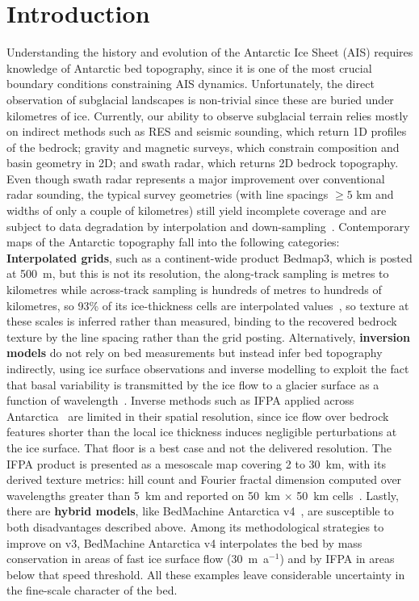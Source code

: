 \chapter{Introduction}\label{intro}

Understanding the history and evolution of the Antarctic Ice Sheet (AIS) requires knowledge of Antarctic bed topography, since it is one of the most crucial boundary 
conditions constraining AIS dynamics. Unfortunately, the direct observation of subglacial landscapes is non-trivial since these are buried under kilometres of ice.
Currently, our ability to observe subglacial terrain relies mostly on indirect methods such as RES and seismic sounding, which return 1D profiles of the bedrock; gravity and magnetic surveys, which constrain composition and basin geometry in 2D; and swath radar, which returns 2D bedrock topography. Even though swath radar represents a major improvement over conventional radar sounding, the typical survey geometries (with line spacings $\geq5$ km and widths of only a couple of kilometres) still yield incomplete coverage and are subject to data degradation by interpolation and down-sampling~\cite{Holschuh_2020}.
Contemporary maps of the Antarctic topography fall into the following categories:\\
\textbf{Interpolated grids}, such as a continent-wide product Bedmap3, which is posted at 500~m, but this is not its resolution, the along-track sampling is metres to kilometres while across-track sampling is hundreds of metres to hundreds of kilometres, so 93\% of its ice-thickness cells are interpolated values~\cite{Pritchard_2025}, so texture at these scales is inferred rather than measured, binding to the recovered bedrock texture by the line spacing
rather than the grid posting. Alternatively, \textbf{inversion models} do not rely on bed measurements but instead infer bed topography indirectly, using ice surface observations and inverse modelling to exploit the fact that basal variability is transmitted by the ice flow to a glacier surface as a function of wavelength~\cite{Gudmundsson_2003}. Inverse methods such as IFPA applied across Antarctica~\cite{Ockenden_2026} are limited in their spatial resolution, since ice flow over bedrock features shorter than the local ice thickness induces negligible perturbations at the ice surface. That floor is a best case and not the delivered resolution. The IFPA product is presented as a mesoscale map covering 2 to 30~km, with its derived texture metrics: hill count and Fourier fractal dimension computed over wavelengths greater than 5~km and reported on 50~km $\times$ 50~km cells~\cite{Ockenden_2026}. Lastly, there are \textbf{hybrid models}, like BedMachine Antarctica v4~\cite{Morlighem_2026}, are susceptible to both disadvantages described above. Among its methodological strategies to improve on v3, BedMachine Antarctica v4 interpolates the bed by mass conservation in areas of fast ice surface flow (30~m~a$^{-1}$) and by IFPA in areas below that speed threshold. All these examples leave considerable uncertainty in the fine-scale character of the bed.\\

